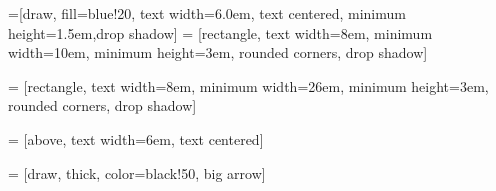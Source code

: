 \usetikzlibrary{shadows,arrows}
\usetikzlibrary{decorations.markings}


=[draw, fill=blue!20, text width=6.0em, text centered,
  minimum height=1.5em,drop shadow]
 = [rectangle, text width=8em, minimum width=10em,
  minimum height=3em, rounded corners, drop shadow]

 = [rectangle, text width=8em, minimum width=26em,
  minimum height=3em, rounded corners, drop shadow]

 = [above, text width=6em, text centered]

 = [draw, thick, color=black!50, big arrow]

\newcommand{\practica}[2]{node (p#1) [practica] {#2}}
\newcommand{\longhorse}[2]{node (p#1) [long] {#2}}
\newcommand{\implemented}[2]{node (p#1) [interface] {#2}}
 

